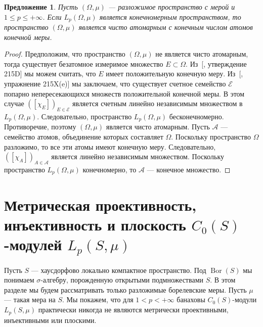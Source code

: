 \documentclass[12pt]{article}
\newtheorem{proposition}[theorem]{Предложение}
\begin{document}
\begin{proposition}\label{LpFinDimCharac}
    Пусть $(\Omega,\mu)$ --- разложимое пространство с мерой 
    и $1\leq p\leq+\infty$. Если $L_p(\Omega,\mu)$ является конечномерным 
    пространством, то пространство $(\Omega,\mu)$ является чисто атомарным с 
    конечным числом атомов конечной меры.
\end{proposition} 
\begin{proof}
    Предположим, что пространство $(\Omega,\mu)$ не является чисто атомарным, 
    тогда существует безатомное измеримое множество $E\subset \Omega$. 
    Из~[\cite{FremMeasTh2}, утверждение 215D] мы можем считать, что $E$ имеет 
    положительную конечную меру. Из~[\cite{FremMeasTh2}, упражнение 215X(e)] мы 
    заключаем, что существует счетное семейство $\mathcal{E}$ попарно 
    непересекающихся множеств положительной конечной меры. В этом 
    случае $([\chi_{E}])_{E\in\mathcal{E}}$ является счетным линейно независимым 
    множеством в $L_p(\Omega,\mu)$. Следовательно, пространство 
    $L_p(\Omega,\mu)$  бесконечномерно. Противоречие, поэтому $(\Omega,\mu)$ 
    является чисто атомарным. Пусть $\mathcal{A}$ --- семейство атомов, 
    объединение которых составляет $\Omega$. Поскольку пространство $\Omega$ 
    разложимо, то все эти атомы имеют конечную меру. 
    Следовательно, $([\chi_{A}])_{A\in\mathcal{A}}$ 
    является линейно независимым множеством. Поскольку 
    пространство $L_p(\Omega,\mu)$ конечномерно, 
    то $\mathcal{A}$ --- конечное множество.
\end{proof}


\section{Метрическая проективность, инъективность и плоскость 
\texorpdfstring{$C_0(S)$}{C0(S)}-модулей 
\texorpdfstring{$L_p(S,\mu)$}{LpSmu}}
\label{MetrProInjFltOfC0SModLp}

Пусть $S$ --- хаусдорфово локально компактное пространство. 
Под $\operatorname{Bor}(S)$ мы понимаем $\sigma$-алгебру, порожденную открытыми 
подмножествами $S$. В этом разделе мы будем рассматривать только разложимые 
борелевские меры. Пусть $\mu$ --- такая мера на $S$. Мы покажем, что 
для $1<p<+\infty$ банаховы $C_0(S)$-модули $L_p(S,\mu)$ практически никогда не 
являются метрически проективными, инъективными или плоскими. 
\end{document}
